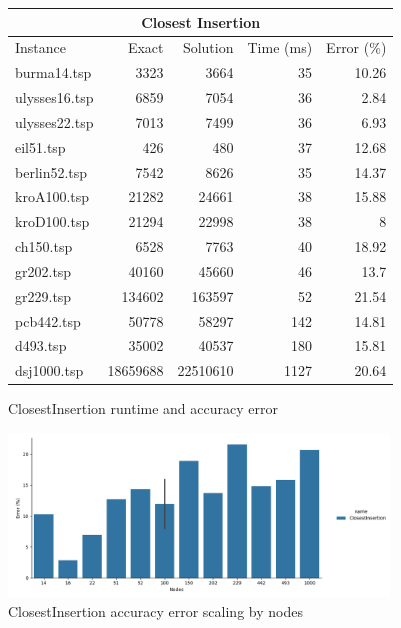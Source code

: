 \begin{figure}
    \centering

    \begin{tabular}{lrrrr}
    \toprule
    \multicolumn{5}{c}{Closest Insertion} \\
    \hline
    Instance & Exact & Solution &   Time (ms) &   Error (\%) \\
    \hline
    burma14.tsp   &     3323 &       3664 &          35 &       10.26 \\
    ulysses16.tsp &     6859 &       7054 &          36 &        2.84 \\
    ulysses22.tsp &     7013 &       7499 &          36 &        6.93 \\
    eil51.tsp     &      426 &        480 &          37 &       12.68 \\
    berlin52.tsp  &     7542 &       8626 &          35 &       14.37 \\
    kroA100.tsp   &    21282 &      24661 &          38 &       15.88 \\
    kroD100.tsp   &    21294 &      22998 &          38 &        8    \\
    ch150.tsp     &     6528 &       7763 &          40 &       18.92 \\
    gr202.tsp     &    40160 &      45660 &          46 &       13.7  \\
    gr229.tsp     &   134602 &     163597 &          52 &       21.54 \\
    pcb442.tsp    &    50778 &      58297 &         142 &       14.81 \\
    d493.tsp      &    35002 &      40537 &         180 &       15.81 \\
    dsj1000.tsp   & 18659688 &   22510610 &        1127 &       20.64 \\
    \bottomrule
    \end{tabular}

    \caption{ClosestInsertion runtime and accuracy error}
    \label{table:closest-insertion-runtime-accuracy}
\end{figure}

\begin{figure}
    \centering

    \includegraphics[width=0.9\textwidth]{./images/ClosestInsertion_(approximation_error).png}

    \caption{ClosestInsertion accuracy error scaling by nodes}
    \label{fig:closest-insertion-accuracy-error}
\end{figure}

